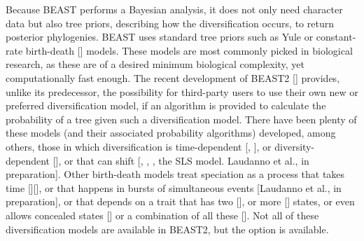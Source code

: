 \documentclass{article}
\begin{document}
Because BEAST performs a Bayesian analysis, 
it does not only need character data but also tree priors, 
describing how the diversification occurs, to return posterior phylogenies.
BEAST uses standard tree priors such as Yule or 
constant-rate birth-death [\cite{nee1994reconstructed}] models.
These models are most commonly picked in biological research,
as these are of a desired minimum biological complexity, 
yet computationally fast enough.
The recent development of BEAST2 [\cite{bouckaert2014beast}] provides, 
unlike its predecessor, the possibility for third-party users 
to use their own new or preferred diversification model, 
if an algorithm is provided to calculate the probability 
of a tree given such a diversification model.
There have been plenty of these models (and their associated probability algorithms) 
developed, among others, those in which diversification is 
time-dependent [\cite{nee1994reconstructed}, \cite{rabosky2008explosive}], 
or diversity-dependent [\cite{etienne2011diversity}],
or that can shift [\cite{etienne2012conceptual}, \cite{rabosky2014automatic}, \cite{alfaro2009nine}, the SLS model. Laudanno et al., in preparation].
Other birth-death models treat speciation as a process that takes time [\cite{rosindell2010protracted}][\cite{etienne2012prolonging}], or that happens in bursts of simultaneous events [Laudanno et al., in preparation], or that
depends on a trait that has two [\cite{maddison2007estimating}], 
or more [\cite{fitzjohn2012diversitree}] states,
or even allows concealed states [\cite{beaulieu2016detecting}] 
or a combination of all these [\cite{herrera2018detecting}].
Not all of these diversification models are available in BEAST2, 
but the option is available.
\end{document}
